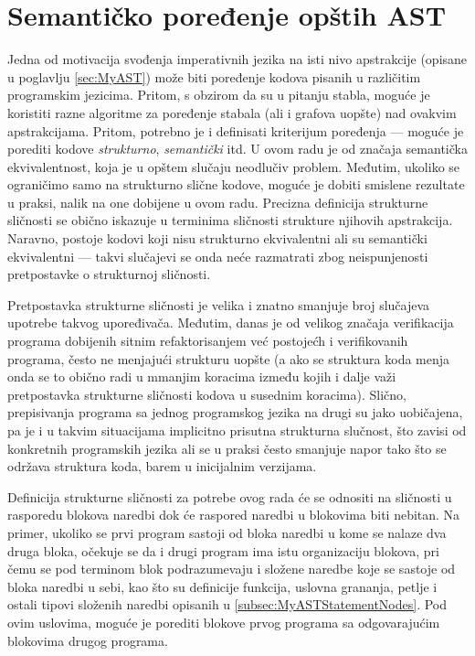 \chapter{Semantičko poređenje opštih AST}
\label{chp:ASTComparing}

Jedna od motivacija svođenja imperativnih jezika na isti nivo apstrakcije (opisane u poglavlju \ref{sec:MyAST}) može biti poređenje kodova pisanih u različitim programskim jezicima. Pritom, s obzirom da su u pitanju stabla, moguće je koristiti razne algoritme za poređenje stabala (ali i grafova uopšte) nad ovakvim apstrakcijama. Pritom, potrebno je i definisati kriterijum poređenja --- moguće je porediti kodove \emph{strukturno}, \emph{semantički} itd. U ovom radu je od značaja semantička ekvivalentnost, koja je u opštem slučaju neodlučiv problem. Međutim, ukoliko se ograničimo samo na strukturno slične kodove, moguće je dobiti smislene rezultate u praksi, nalik na one dobijene u ovom radu. Precizna definicija strukturne sličnosti se obično iskazuje u terminima sličnosti strukture njihovih apstrakcija. Naravno, postoje kodovi koji nisu strukturno ekvivalentni ali su semantički ekvivalentni --- takvi slučajevi se onda neće razmatrati zbog neispunjenosti pretpostavke o strukturnoj sličnosti. 

Pretpostavka strukturne sličnosti je velika i znatno smanjuje broj slučajeva upotrebe takvog upoređivača. Međutim, danas je od velikog značaja verifikacija programa dobijenih sitnim refaktorisanjem već postojećh i verifikovanih programa, često ne menjajući strukturu uopšte (a ako se struktura koda menja onda se to obično radi u mmanjim koracima između kojih i dalje važi pretpostavka strukturne sličnosti kodova u susednim koracima). Slično, prepisivanja programa sa jednog programskog jezika na drugi su jako uobičajena, pa je i u takvim situacijama implicitno prisutna strukturna slučnost, što zavisi od konkretnih programskih jezika ali se u praksi često smanjuje napor tako što se održava struktura koda, barem u inicijalnim verzijama. 

Definicija strukturne sličnosti za potrebe ovog rada će se odnositi na sličnosti u rasporedu blokova naredbi dok će raspored naredbi u blokovima biti nebitan. Na primer, ukoliko se prvi program sastoji od bloka naredbi u kome se nalaze dva druga bloka, očekuje se da i drugi program ima istu organizaciju blokova, pri čemu se pod terminom blok podrazumevaju i složene naredbe koje se sastoje od bloka naredbi u sebi, kao što su definicije funkcija, uslovna grananja, petlje i ostali tipovi složenih naredbi opisanih u \ref{subsec:MyASTStatementNodes}. Pod ovim uslovima, moguće je porediti blokove prvog programa sa odgovarajućim blokovima drugog programa.




